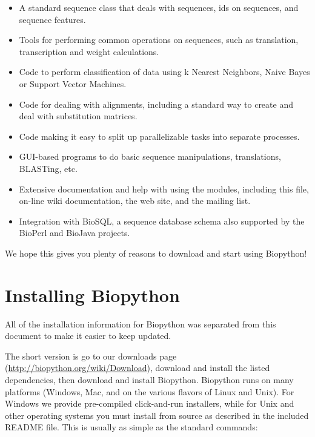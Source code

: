 \documentclass{report}
\begin{document}
\begin{itemize}
  \item A standard sequence class that deals with sequences, ids on sequences, and sequence features.

  \item Tools for performing common operations on sequences, such as translation, transcription and weight calculations.

  \item Code to perform classification of data using k Nearest Neighbors, Naive Bayes or Support Vector Machines.

  \item Code for dealing with alignments, including a standard way to create and deal with substitution matrices.

  \item Code making it easy to split up parallelizable tasks into separate processes.

  \item GUI-based programs to do basic sequence manipulations, translations, BLASTing, etc.

  \item Extensive documentation and help with using the modules, including this file, on-line wiki documentation, the web site, and the mailing list.

  \item Integration with BioSQL, a sequence database schema also supported by the BioPerl and BioJava projects.

\end{itemize}

We hope this gives you plenty of reasons to download and start using Biopython!

\section{Installing Biopython}

All of the installation information for Biopython was separated from
this document to make it easier to keep updated.

The short version is go to our downloads page (\url{http://biopython.org/wiki/Download}),
download and install the listed dependencies, then download and install Biopython.
Biopython runs on many platforms (Windows, Mac, and on the various flavors of Linux and Unix).
For Windows we provide pre-compiled click-and-run installers, while for Unix and other
operating systems you must install from source as described in the included README file.
This is usually as simple as the standard commands:
\end{document}
